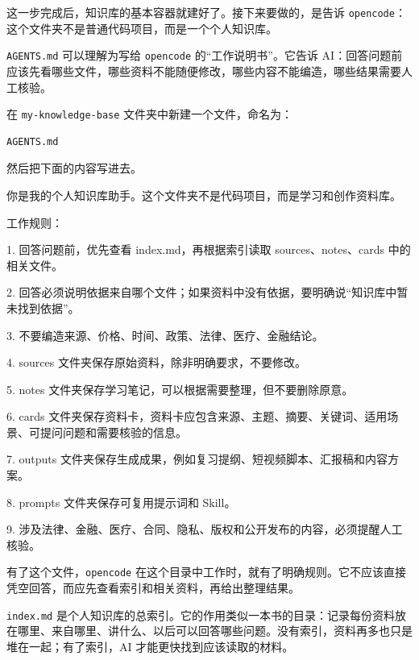 这一步完成后，知识库的基本容器就建好了。接下来要做的，是告诉 \texttt{opencode}：这个文件夹不是普通代码项目，而是一个个人知识库。


\texttt{AGENTS.md} 可以理解为写给 \texttt{opencode} 的“工作说明书”。它告诉 AI：回答问题前应该先看哪些文件，哪些资料不能随便修改，哪些内容不能编造，哪些结果需要人工核验。

\begin{tcolorbox}[stepbox,title=操作 2：创建工作规则文件]
在 \texttt{my-knowledge-base} 文件夹中新建一个文件，命名为：

\begin{verbatim}
AGENTS.md
\end{verbatim}

然后把下面的内容写进去。
\end{tcolorbox}

\begin{tcolorbox}[filebox,title=AGENTS.md 示例]
你是我的个人知识库助手。这个文件夹不是代码项目，而是学习和创作资料库。

工作规则：

1. 回答问题前，优先查看 index.md，再根据索引读取 sources、notes、cards 中的相关文件。

2. 回答必须说明依据来自哪个文件；如果资料中没有依据，要明确说“知识库中暂未找到依据”。

3. 不要编造来源、价格、时间、政策、法律、医疗、金融结论。

4. sources 文件夹保存原始资料，除非明确要求，不要修改。

5. notes 文件夹保存学习笔记，可以根据需要整理，但不要删除原意。

6. cards 文件夹保存资料卡，资料卡应包含来源、主题、摘要、关键词、适用场景、可提问问题和需要核验的信息。

7. outputs 文件夹保存生成成果，例如复习提纲、短视频脚本、汇报稿和内容方案。

8. prompts 文件夹保存可复用提示词和 Skill。

9. 涉及法律、金融、医疗、合同、隐私、版权和公开发布的内容，必须提醒人工核验。
\end{tcolorbox}

有了这个文件，\texttt{opencode} 在这个目录中工作时，就有了明确规则。它不应该直接凭空回答，而应先查看索引和相关资料，再给出整理结果。


\texttt{index.md} 是个人知识库的总索引。它的作用类似一本书的目录：记录每份资料放在哪里、来自哪里、讲什么、以后可以回答哪些问题。没有索引，资料再多也只是堆在一起；有了索引，AI 才能更快找到应该读取的材料。

